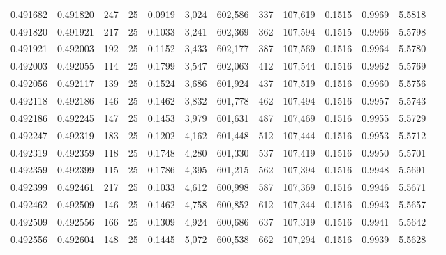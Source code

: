 \begin{tabular}{rrrrrrrrrrrrr}
0.491682 & 0.491820 & 247 &  25 &                                     0.0919 &   3,024 & 602,586 &     337 & 107,619 & 0.1515 & 0.9969 & 5.5818 \\
0.491820 & 0.491921 & 217 &  25 &                                     0.1033 &   3,241 & 602,369 &     362 & 107,594 & 0.1515 & 0.9966 & 5.5798 \\
0.491921 & 0.492003 & 192 &  25 &                                     0.1152 &   3,433 & 602,177 &     387 & 107,569 & 0.1516 & 0.9964 & 5.5780 \\
0.492003 & 0.492055 & 114 &  25 &                                     0.1799 &   3,547 & 602,063 &     412 & 107,544 & 0.1516 & 0.9962 & 5.5769 \\
0.492056 & 0.492117 & 139 &  25 &                                     0.1524 &   3,686 & 601,924 &     437 & 107,519 & 0.1516 & 0.9960 & 5.5756 \\
0.492118 & 0.492186 & 146 &  25 &                                     0.1462 &   3,832 & 601,778 &     462 & 107,494 & 0.1516 & 0.9957 & 5.5743 \\
0.492186 & 0.492245 & 147 &  25 &                                     0.1453 &   3,979 & 601,631 &     487 & 107,469 & 0.1516 & 0.9955 & 5.5729 \\
0.492247 & 0.492319 & 183 &  25 &                                     0.1202 &   4,162 & 601,448 &     512 & 107,444 & 0.1516 & 0.9953 & 5.5712 \\
0.492319 & 0.492359 & 118 &  25 &                                     0.1748 &   4,280 & 601,330 &     537 & 107,419 & 0.1516 & 0.9950 & 5.5701 \\
0.492359 & 0.492399 & 115 &  25 &                                     0.1786 &   4,395 & 601,215 &     562 & 107,394 & 0.1516 & 0.9948 & 5.5691 \\
0.492399 & 0.492461 & 217 &  25 &                                     0.1033 &   4,612 & 600,998 &     587 & 107,369 & 0.1516 & 0.9946 & 5.5671 \\
0.492462 & 0.492509 & 146 &  25 &                                     0.1462 &   4,758 & 600,852 &     612 & 107,344 & 0.1516 & 0.9943 & 5.5657 \\
0.492509 & 0.492556 & 166 &  25 &                                     0.1309 &   4,924 & 600,686 &     637 & 107,319 & 0.1516 & 0.9941 & 5.5642 \\
0.492556 & 0.492604 & 148 &  25 &                                     0.1445 &   5,072 & 600,538 &     662 & 107,294 & 0.1516 & 0.9939 & 5.5628 \\

\end{tabular}
